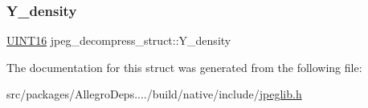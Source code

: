 \mbox{\label{structjpeg__decompress__struct_a2bfa78f638ae718f6601fd64a3b9f7aa}} 
\subsubsection{\texorpdfstring{Y\+\_\+density}{Y\_density}}
{\footnotesize\ttfamily \hyperlink{jmorecfg_8h_a805c2c164bdd38d72a30c46e84fb568b}{U\+I\+N\+T16} jpeg\+\_\+decompress\+\_\+struct\+::\+Y\+\_\+density}



The documentation for this struct was generated from the following file\+:\begin{DoxyCompactItemize}
\item 
src/packages/\+Allegro\+Deps..../build/native/include/\hyperlink{jpeglib_8h}{jpeglib.\+h}\end{DoxyCompactItemize}
